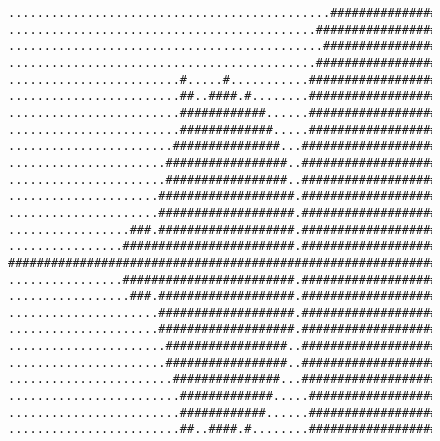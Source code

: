 \documentclass[mscres,cdtppar,twoside,openright,logo,rightchapter,normalheadings]{infthesis}
\theoremstyle{definition}
\begin{document}
\begin{figure}
\begin{lstlisting}[style={},basicstyle=\ttfamily\tiny,breaklines=false,morekeywords={\#},keywordstyle={\color{blue}}]
.............................................#######################################................
...........................................############################################.............
............................................###########################################.............
...........................................##########################################...............
........................#.....#...........###########################################...............
........................##..####.#........############################################..............
........................############......#############################################.............
........................#############.....############################################..............
.......................###############...#############################################..............
......................#################..#############################################..............
......................#################..############################################...............
.....................###################.############################################...............
.....................###################.###########################################................
.................###.###################.###########################################................
................########################.#########################################..................
#################################################################################...................
................########################.#########################################..................
.................###.###################.###########################################................
.....................###################.###########################################................
.....................###################.############################################...............
......................#################..############################################...............
......................#################..#############################################..............
.......................###############...#############################################..............
........................#############.....############################################..............
........................############......#############################################.............
........................##..####.#........############################################..............

\end{lstlisting}
\end{figure}
\end{document}
